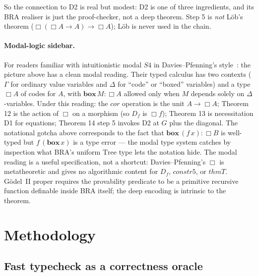 \documentclass[11pt]{article}
\begin{document}
So the connection to D2 is real but modest: D2 is one of three
ingredients, and its BRA realiser is just the proof-checker, not a
deep theorem.  Step 5 is \emph{not} L\"ob's theorem
($\Box(\Box A \to A) \to \Box A$); L\"ob is never used in the chain.

\paragraph{Modal-logic sidebar.}
For readers familiar with intuitionistic modal $S4$ in
Davies--Pfenning's style~\cite{daviespfenning2001}: the picture
above has a clean modal reading.  Their typed calculus has two
contexts ($\Gamma$ for ordinary value variables and $\Delta$ for
``code'' or ``boxed'' variables) and a type $\Box A$ of codes for
$A$, with $\mathbf{box}\,M : \Box A$ allowed only when $M$ depends
solely on $\Delta$-variables.  Under this reading: the $\mathit{cor}$
operation is the unit $A \to \Box A$; Theorem 12 is the action of
$\Box$ on a morphism (so $D_f$ is $\Box f$); Theorem 13 is
necessitation D1 for equations; Theorem 14 step 5 invokes D2 at $G$
plus the diagonal.  The notational gotcha above corresponds to the
fact that $\mathbf{box}\,(f\,x) : \Box B$ is well-typed but
$f\,(\mathbf{box}\,x)$ is a type error --- the modal type system
catches by inspection what BRA's uniform $\mathrm{Tree}$ type lets the
notation hide.  The modal reading is a useful specification, not a
shortcut: Davies--Pfenning's $\Box$ is metatheoretic and gives no
algorithmic content for $D_f$, $\mathit{constr5}$, or $\mathit{thmT}$.
G\"odel~II proper requires the provability predicate to be a primitive
recursive function definable inside BRA itself; the deep encoding is
intrinsic to the theorem.

\section{Methodology}

\subsection{Fast typecheck as a correctness oracle}
\end{document}
